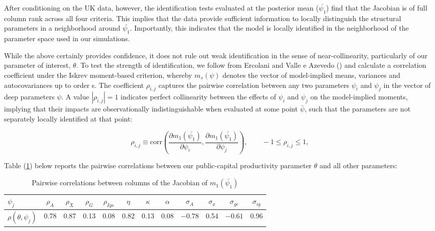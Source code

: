 \documentclass[titlepage, 11pt, a4paper]{article}
\renewcommand{\&}{and}
\begin{document}
After conditioning on the UK data, however, the identification tests evaluated at the posterior mean ($\bar{\psi_1}$) find that the Jacobian is of full column rank across all four criteria. This implies that the data provide sufficient information to locally distinguish the structural parameters in a neighborhood around $\bar{\psi_1}$. Importantly, this indicates that the model is locally identified in the neighborhood of the parameter space used in our simulations.

While the above certainly provides confidence, it does not rule out weak identification in the sense of near-collinearity, particularly of our parameter of interest, $\theta$. To test the strength of  identification, we follow from Ercolani and Valle e Azevedo (\citeyear{ercolani2014effects}) and calculate a correlation coefficient under the Iskrev moment-based criterion, whereby $m_s(\psi)$ denotes the vector of model-implied means, variances and autocovariances up to order s. The coefficient $\rho_{i,j}$ captures the pairwise correlation between any two parameters $\psi_i$ and $\psi_j$ in the vector of deep parameters $\psi$. A value $|\rho_{i,j}| = 1$ indicates perfect collinearity between the effects
of $\psi_i$ and $\psi_j$ on the model-implied moments, implying that their
impacts are observationally indistinguishable when evaluated at some point $\bar{\psi}$, such that the
parameters are not separately locally identified at that point:

\[\rho_{i,j} \equiv \mathrm{corr}\!\left(
\frac{\partial m_1(\bar{\psi_1})}{\partial \psi_i},
\frac{\partial m_1(\bar{\psi_1})}{\partial \psi_j}
\right),
\qquad -1 \le \rho_{i,j} \le 1,\]


Table (\ref{tab:corr}) below reports the pairwise correlations between our public-capital productivity parameter $\theta$ and all other parameters:



\begin{table}[htbp]
\centering
\caption{Pairwise correlations between columns of the Jacobian of $m_1(\bar{\psi_1})$}
\label{tab:corr}

\begin{tabular}{lccccccccccc}
\toprule
$\psi_j$ 
& $\rho_A$ 
& $\rho_X$ 
& $\rho_G$ 
& $\rho_{Igs}$ 
& $\eta$ 
& $\kappa$ 
& $\alpha$ 
& $\sigma_A$ 
& $\sigma_x$ 
& $\sigma_{gc}$ 
& $\sigma_{ig}$ \\
\midrule
$\rho(\theta,\psi_j)$ 
& 0.78 
& 0.87 
& 0.13 
& 0.08 
& 0.82 
& 0.13 
& 0.08 
& $-0.78$ 
& 0.54 
& $-0.61$ 
& 0.96 \\
\bottomrule
\end{tabular}
\end{table}
\end{document}
